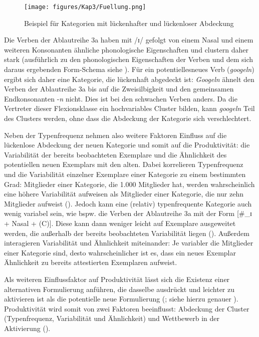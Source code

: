 \begin{figure}
\texttt{[image: figures/Kap3/Fuellung.png]}  
\caption{Beispiel für Kategorien mit lückenhafter und lückenloser Abdeckung}
\label{fuellung}
\end{figure}

Die Verben der Ablautreihe 3a haben mit /ɪ/ gefolgt von einem Nasal und einem weiteren Konsonanten ähnliche phonologische Eigenschaften und clustern daher stark (ausführlich zu den phonologischen Eigenschaften der Verben und dem sich daraus ergebenden Form-Schema siehe ). Für ein potentiellesneues Verb (\textit{googeln}) ergibt sich daher eine Kategorie, die lückenhaft abgedeckt ist: \textit{Googeln} ähnelt den Verben der Ablautreihe 3a bis auf die Zweisilbigkeit und den gemeinsamen Endkonsonanten -\textit{n} nicht. Dies ist bei den schwachen Verben anders. Da die Vertreter dieser Flexionsklasse ein hochvariables Cluster bilden, kann \textit{googeln} Teil des Clusters werden, ohne dass die Abdeckung der Kategorie sich verschlechtert.

Neben der Typenfrequenz nehmen also weitere Faktoren Einfluss auf die lückenlose Abdeckung der neuen Kategorie und somit auf die Produktivität: die Variabilität der bereits beobachteten Exemplare und die Ähnlichkeit des potentiellen neuen Exemplars mit den alten. Dabei korrelieren Typenfrequenz und die Variabilität einzelner Exemplare einer Kategorie zu einem bestimmten Grad: Mitglieder einer Kategorie, die 1.000 Mitglieder hat, werden wahrscheinlich eine höhere Variabilität aufweisen als Mitglieder einer Kategorie, die nur zehn Mitglieder aufweist (\cite[65]{Goldberg.2019}). Jedoch kann eine (relativ) typenfrequente Kategorie auch wenig variabel sein, wie bspw. die Verben der Ablautreihe 3a mit der Form [\#\_ɪ + Nasal + (C)]. Diese kann dann weniger leicht auf Exemplare ausgeweitet werden, die außerhalb der bereits beobachteten Variabilität liegen (\cite[67]{Goldberg.2019}). Außerdem interagieren Variabilität und Ähnlichkeit miteinander: Je variabler die Mitglieder einer Kategorie sind, desto wahrscheinlicher ist es, dass ein neues Exemplar Ähnlichkeit zu bereits attestierten Exemplaren aufweist.

Als weiteren Einflussfaktor auf Produktivität lässt sich die Existenz einer alternativen Formulierung anführen, die dasselbe ausdrückt und leichter zu aktivieren ist als die potentielle neue Formulierung (\cite[70]{Goldberg.2019}; siehe hierzu genauer ). Produktivität wird somit von zwei Faktoren beeinflusst: Abdeckung der Cluster (Typenfrequenz, Variabilität und Ähnlichkeit) und Wettbewerb in der Aktivierung (\cite[117]{Goldberg.2019}).

